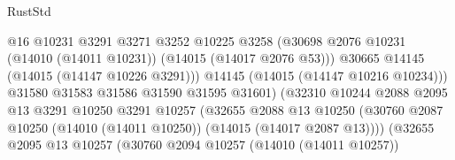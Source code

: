 \begin{lexlean}{RustStd}
\begin{coremodule}
                                              @16
                                              @10231
                                              @3291
                                              @3271
                                              @3252
                                              @10225
                                              @3258
                                              (@30698
                                                @2076
                                                @10231
                                                (@14010 (@14011 @10231))
                                                (@14015 (@14017 @2076 @53)))
                                              @30665
                                              @14145
                                              (@14015 (@14147 @10226 @3291)))
                                            @14145
                                            (@14015 (@14147 @10216 @10234)))
                                          @31580
                                          @31583
                                          @31586
                                          @31590
                                          @31595
                                          @31601)
                                        (@32310
                                          @10244
                                          @2088
                                          @2095
                                          @13
                                          @3291
                                          @10250
                                          @3291
                                          @10257
                                          (@32655
                                            @2088
                                            @13
                                            @10250
                                            (@30760
                                              @2087
                                              @10250
                                              (@14010 (@14011 @10250))
                                              (@14015 (@14017 @2087 @13))))
                                          (@32655
                                            @2095
                                            @13
                                            @10257
                                            (@30760
                                              @2094
                                              @10257
                                              (@14010 (@14011 @10257))

\end{coremodule}
\end{lexlean}
